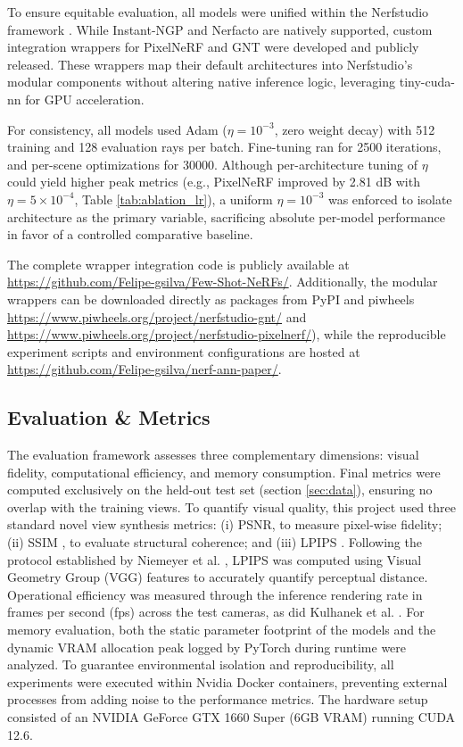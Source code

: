 To ensure equitable evaluation, all models were unified within the Nerfstudio framework \cite{Tancik2023}. While Instant-NGP and Nerfacto are natively supported, custom integration wrappers for PixelNeRF and GNT were developed and publicly released. These wrappers map their default architectures into Nerfstudio's modular components without altering native inference logic, leveraging tiny-cuda-nn \cite{tinycudann} for GPU acceleration.

For consistency, all models used Adam ($\eta = 10^{-3}$, zero weight decay) with 512 training and 128 evaluation rays per batch. Fine-tuning ran for 2500 iterations, and per-scene optimizations for 30000. Although per-architecture tuning of $\eta$ could yield higher peak metrics (e.g., PixelNeRF improved by 2.81 dB with $\eta = 5 \times 10^{-4}$, Table \ref{tab:ablation_lr}), a uniform $\eta = 10^{-3}$ was enforced to isolate architecture as the primary variable, sacrificing absolute per-model performance in favor of a controlled comparative baseline. 


The complete wrapper integration code is publicly available at \url{https://github.com/Felipe-gsilva/Few-Shot-NeRFs/}. Additionally, the modular wrappers can be downloaded directly as packages from PyPI and piwheels \url{https://www.piwheels.org/project/nerfstudio-gnt/} and \url{https://www.piwheels.org/project/nerfstudio-pixelnerf/}), while the reproducible experiment scripts and environment configurations are hosted at \url{https://github.com/Felipe-gsilva/nerf-ann-paper/}.

\subsection{Evaluation \& Metrics}
\label{sec:metrics}

The evaluation framework assesses three complementary dimensions: visual fidelity, computational efficiency, and memory consumption. Final metrics were computed exclusively on the held-out test set (section \ref{sec:data}), ensuring no overlap with the training views. To quantify visual quality, this project used three standard novel view synthesis metrics: (i) PSNR, to measure pixel-wise fidelity; (ii) SSIM \cite{wang2004image}, to evaluate structural coherence; and (iii) LPIPS \cite{zhang2018unreasonable}. Following the protocol established by Niemeyer et al. \cite{niemeyer2022regnerf}, LPIPS was computed using Visual Geometry Group (VGG) features to accurately quantify perceptual distance. Operational efficiency was measured through the inference rendering rate in frames per second (fps) across the test cameras, as did Kulhanek et al. \cite{kulhanek2025nerfbaselinesconsistentreproducibleevaluation}. For memory evaluation,  both the static parameter footprint of the models and the dynamic VRAM allocation peak logged by PyTorch during runtime were analyzed. To guarantee environmental isolation and reproducibility, all experiments were executed within Nvidia Docker containers, preventing external processes from adding noise to the performance metrics. The hardware setup consisted of an NVIDIA GeForce GTX 1660 Super (6GB VRAM) running CUDA 12.6.
